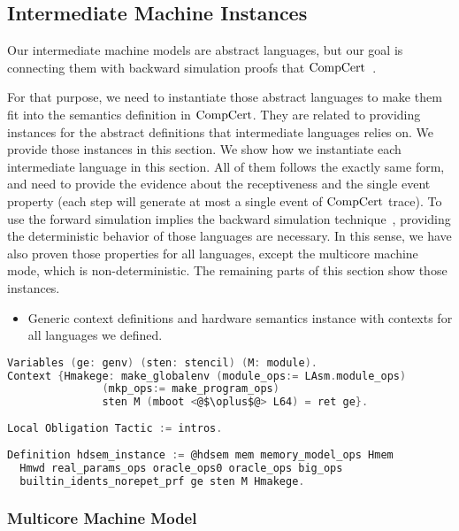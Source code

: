 
\subsection{Intermediate Machine Instances}
\label{chapter:certikos:subsec:intermediate-machine-instantiation}

Our intermediate machine models are abstract languages, but 
our goal is connecting them with backward simulation proofs that $\mathrm{CompCert}$~\cite{leroy06}.

For that purpose, 
we need to instantiate those abstract languages to make them fit into 
the semantics definition in $\mathrm{CompCert}$.
They are related to
providing instances 
for the abstract definitions that intermediate languages relies on. 
We provide those instances in this section. 
We show how we instantiate each intermediate language 
in this section. All of them follows the exactly same form, 
and need to provide the evidence about the receptiveness and the single event property (each step will generate at most a single event of $\mathrm{CompCert}$ trace). 
To use the forward simulation implies the backward simulation technique~\cite{leroy06},
providing the deterministic behavior of those languages 
are necessary. 
In this sense, 
we have also proven those properties 
for all languages, except the multicore machine mode, which is non-deterministic. 
The remaining parts of this section 
show those instances.

\begin{itemize}[leftmargin=*]
\item Generic context definitions and hardware semantics instance with contexts for all languages we defined.
\end{itemize}
\begin{lstlisting}[language=C]
Variables (ge: genv) (sten: stencil) (M: module).
Context {Hmakege: make_globalenv (module_ops:= LAsm.module_ops)
               (mkp_ops:= make_program_ops) 
               sten M (mboot <@$\oplus$@> L64) = ret ge}.        
    
Local Obligation Tactic := intros.
    
Definition hdsem_instance := @hdsem mem memory_model_ops Hmem 
  Hmwd real_params_ops oracle_ops0 oracle_ops big_ops 
  builtin_idents_norepet_prf ge sten M Hmakege.    
\end{lstlisting}

\subsubsection{Multicore Machine Model}

